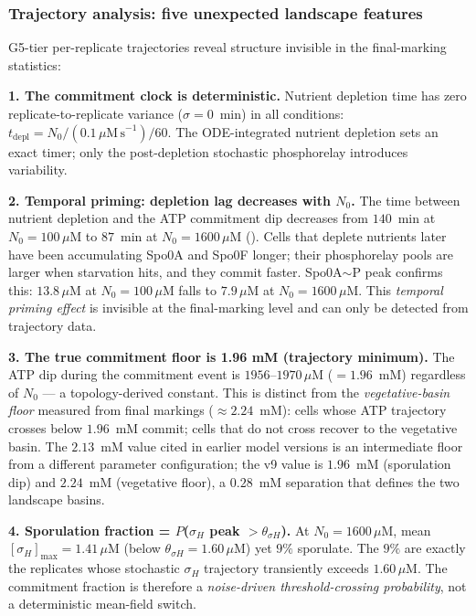 \documentclass[11pt,a4paper]{article}
\begin{document}
\subsubsection*{Trajectory analysis: five unexpected landscape features}

G5-tier per-replicate trajectories reveal structure invisible in
the final-marking statistics:

\textbf{1. The commitment clock is deterministic.}
Nutrient depletion time has zero replicate-to-replicate variance
($\sigma = 0$~min) in all conditions: $t_{\mathrm{depl}} = N_0 /
(0.1\,\mu\mathrm{M\,s}^{-1}) / 60$.  The ODE-integrated nutrient
depletion sets an exact timer; only the post-depletion stochastic
phosphorelay introduces variability.

\textbf{2. Temporal priming: depletion lag decreases with $N_0$.}
The time between nutrient depletion and the ATP commitment dip
decreases from $140$~min at $N_0 = 100\,\mu$M to $87$~min at
$N_0 = 1600\,\mu$M ().  Cells that deplete nutrients
later have been accumulating Spo0A and Spo0F longer; their phosphorelay
pools are larger when starvation hits, and they commit faster.
Spo0A$\sim$P peak confirms this: $13.8\,\mu$M at $N_0 = 100\,\mu$M
falls to $7.9\,\mu$M at $N_0 = 1600\,\mu$M.
This \emph{temporal priming effect} is invisible at the final-marking
level and can only be detected from trajectory data.

\textbf{3. The true commitment floor is 1.96 mM (trajectory minimum).}
The ATP dip during the commitment event is $1956$--$1970\,\mu$M
($= 1.96$~mM) regardless of $N_0$ --- a topology-derived constant.
This is distinct from the \emph{vegetative-basin floor} measured from
final markings ($\approx 2.24$~mM): cells whose ATP trajectory crosses
below $1.96$~mM commit; cells that do not cross recover to the
vegetative basin.  The $2.13$~mM value cited in earlier model versions
is an intermediate floor from a different parameter configuration;
the v9 value is $1.96$~mM (sporulation dip) and $2.24$~mM (vegetative
floor), a $0.28$~mM separation that defines the two landscape basins.

\textbf{4. Sporulation fraction = $P$($\sigma_H$ peak $> \theta_{\sigma H}$).}
At $N_0 = 1600\,\mu$M, mean $[\sigma_H]_{\max} = 1.41\,\mu$M
(below $\theta_{\sigma H} = 1.60\,\mu$M) yet $9\%$ sporulate.
The $9\%$ are exactly the replicates whose stochastic $\sigma_H$
trajectory transiently exceeds $1.60\,\mu$M.  The commitment fraction
is therefore a \emph{noise-driven threshold-crossing probability},
not a deterministic mean-field switch.
\end{document}
